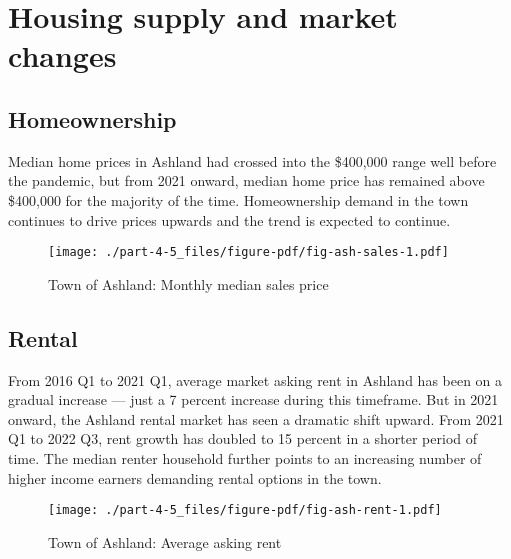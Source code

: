 \documentclass[
  letterpaper,
  DIV=11,
  numbers=noendperiod]{scrreprt}
\begin{document}
\hypertarget{housing-supply-and-market-changes-4}{%
\section{Housing supply and market
changes}\label{housing-supply-and-market-changes-4}}

\hypertarget{homeownership-4}{%
\subsection{Homeownership}\label{homeownership-4}}

Median home prices in Ashland had crossed into the \$400,000 range well
before the pandemic, but from 2021 onward, median home price has
remained above \$400,000 for the majority of the time. Homeownership
demand in the town continues to drive prices upwards and the trend is
expected to continue.

\begin{figure}

{\centering \texttt{[image: ./part-4-5\_files/figure-pdf/fig-ash-sales-1.pdf]}

}

\caption{\label{fig-ash-sales}Town of Ashland: Monthly median sales
price}

\end{figure}

\hypertarget{rental-4}{%
\subsection{Rental}\label{rental-4}}

From 2016 Q1 to 2021 Q1, average market asking rent in Ashland has been
on a gradual increase --- just a 7 percent increase during this
timeframe. But in 2021 onward, the Ashland rental market has seen a
dramatic shift upward. From 2021 Q1 to 2022 Q3, rent growth has doubled
to 15 percent in a shorter period of time. The median renter household
further points to an increasing number of higher income earners
demanding rental options in the town.

\begin{figure}

{\centering \texttt{[image: ./part-4-5\_files/figure-pdf/fig-ash-rent-1.pdf]}

}

\caption{\label{fig-ash-rent}Town of Ashland: Average asking rent}

\end{figure}
\end{document}
